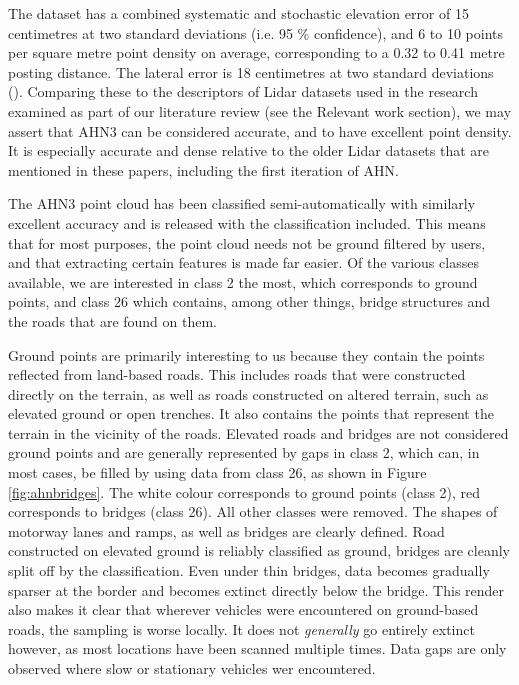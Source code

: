 The dataset has a combined systematic and stochastic elevation error of 15 centimetres at two standard deviations (i.e. 95 \% confidence), and 6 to 10 points per square metre point density on average, corresponding to a 0.32 to 0.41 metre posting distance. The lateral error is 18 centimetres at two standard deviations (\cite{ahn_kwaliteit}). Comparing these to the descriptors of Lidar datasets used in the research examined as part of our literature review (see the Relevant work section), we may assert that AHN3 can be considered accurate, and to have excellent point density. It is especially accurate and dense relative to the older Lidar datasets that are mentioned in these papers, including the first iteration of AHN.

The AHN3 point cloud has been classified semi-automatically with similarly excellent accuracy and is released with the classification included. This means that for most purposes, the point cloud needs not be ground filtered by users, and that extracting certain features is made far easier. Of the various classes available, we are interested in class 2 the most, which corresponds to ground points, and class 26 which contains, among other things, bridge structures and the roads that are found on them.

Ground points are primarily interesting to us because they contain the points reflected from land-based roads. This includes roads that were constructed directly on the terrain, as well as roads constructed on altered terrain, such as elevated ground or open trenches. It also contains the points that represent the terrain in the vicinity of the roads. Elevated roads and bridges are not considered ground points and are generally represented by gaps in class 2, which can, in most cases, be filled by using data from class 26, as shown in Figure \ref{fig:ahnbridges}. The white colour corresponds to ground points (class 2), red corresponds to bridges (class 26). All other classes were removed. The shapes of motorway lanes and ramps, as well as bridges are clearly defined. Road constructed on elevated ground is reliably classified as ground, bridges are cleanly split off by the classification. Even under thin bridges, data becomes gradually sparser at the border and becomes extinct directly below the bridge. This render also makes it clear that wherever vehicles were encountered on ground-based roads, the sampling is worse locally. It does not \textit{generally} go entirely extinct however, as most locations have been scanned multiple times. Data gaps are only observed where slow or stationary vehicles wer encountered.

